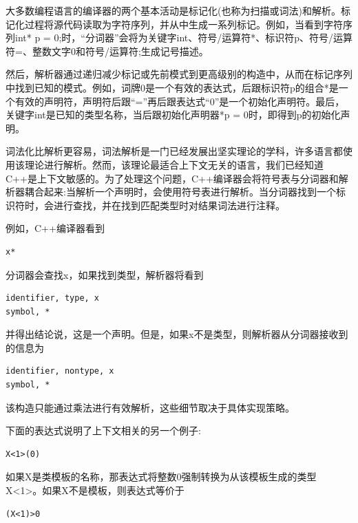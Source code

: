
大多数编程语言的编译器的两个基本活动是标记化(也称为扫描或词法)和解析。标记化过程将源代码读取为字符序列，并从中生成一系列标记。例如，当看到字符序列int* p = 0;时，“分词器”会将为关键字int、符号/运算符*、标识符p、符号/运算符=、整数文字0和符号/运算符;生成记号描述。

然后，解析器通过递归减少标记或先前模式到更高级别的构造中，从而在标记序列中找到已知的模式。例如，词牌0是一个有效的表达式，后跟标识符p的组合*是一个有效的声明符，声明符后跟“=”再后跟表达式“0”是一个初始化声明符。最后，关键字int是已知的类型名称，当后跟初始化声明器*p = 0时，即得到p的初始化声明。


词法化比解析更容易，词法解析是一门已经发展出坚实理论的学科，许多语言都使用该理论进行解析。然而，该理论最适合上下文无关的语言，我们已经知道C++是上下文敏感的。为了处理这个问题，C++编译器会将符号表与分词器和解析器耦合起来:当解析一个声明时，会使用符号表进行解析。当分词器找到一个标识符时，会进行查找，并在找到匹配类型时对结果词法进行注释。

例如，C++编译器看到

\begin{lstlisting}[style=styleCXX]
x*
\end{lstlisting}

分词器会查找x，如果找到类型，解析器将看到

\begin{lstlisting}[style=styleCXX]
identifier, type, x
symbol, *
\end{lstlisting}

并得出结论说，这是一个声明。但是，如果x不是类型，则解析器从分词器接收到的信息为

\begin{lstlisting}[style=styleCXX]
identifier, nontype, x
symbol, *
\end{lstlisting}

该构造只能通过乘法进行有效解析，这些细节取决于具体实现策略。

下面的表达式说明了上下文相关的另一个例子:

\begin{lstlisting}[style=styleCXX]
X<1>(0)
\end{lstlisting}

如果X是类模板的名称，那表达式将整数0强制转换为从该模板生成的类型X<1>。如果X不是模板，则表达式等价于

\begin{lstlisting}[style=styleCXX]
(X<1)>0
\end{lstlisting}

